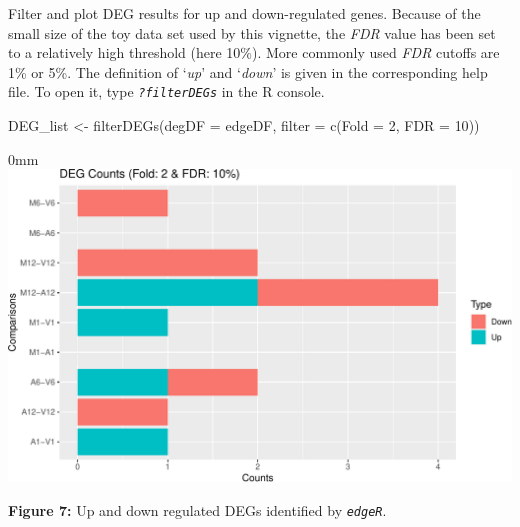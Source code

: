 \documentclass[14pt,]{article}
\newcommand{\hlnum}[1]{\textcolor[rgb]{0.816,0.125,0.439}{#1}}%
\newcommand{\hlstr}[1]{\textcolor[rgb]{0.251,0.627,0.251}{#1}}%
\newcommand{\hlcom}[1]{\textcolor[rgb]{0.502,0.502,0.502}{\textit{#1}}}%
\newcommand{\hlopt}[1]{\textcolor[rgb]{0,0,0}{#1}}%
\newcommand{\hlstd}[1]{\textcolor[rgb]{0.251,0.251,0.251}{#1}}%
\newcommand{\hlkwc}[1]{\textcolor[rgb]{0.251,0.251,0.251}{#1}}%
\newcommand{\hlkwd}[1]{\textcolor[rgb]{0.878,0.439,0.125}{#1}}%
\newenvironment{Shaded}{\begin{myshaded}}{\end{myshaded}}
\newcommand{\KeywordTok}[1]{\hlkwd{#1}}
\newcommand{\DataTypeTok}[1]{\hlkwc{#1}}
\newcommand{\DecValTok}[1]{\hlnum{#1}}
\newcommand{\StringTok}[1]{\hlstr{#1}}
\newcommand{\CommentTok}[1]{\hlcom{#1}}
\newcommand{\OperatorTok}[1]{\hlopt{#1}}
\newcommand{\NormalTok}[1]{\hlstd{#1}}
\begin{document}
Filter and plot DEG results for up and down-regulated genes. Because of the small size of the toy data set used by this vignette, the \emph{FDR} value has been set to a relatively high threshold (here 10\%). More commonly used \emph{FDR} cutoffs are 1\% or 5\%. The definition of `\emph{up}' and `\emph{down}' is given in the corresponding help file. To open it, type \emph{\texttt{?filterDEGs}} in the R console.

\begin{Shaded}
\begin{Highlighting}[]
\NormalTok{DEG_list <-}\StringTok{ }\KeywordTok{filterDEGs}\NormalTok{(}\DataTypeTok{degDF =}\NormalTok{ edgeDF, }\DataTypeTok{filter =} \KeywordTok{c}\NormalTok{(}\DataTypeTok{Fold =} \DecValTok{2}\NormalTok{, }\DataTypeTok{FDR =} \DecValTok{10}\NormalTok{))}
\end{Highlighting}
\end{Shaded}

\begin{adjustwidth}{\fltoffset}{0mm}
\includegraphics{systemPipeR_files/figure-latex/edger_deg_counts-1} \end{adjustwidth}

\textbf{Figure 7:} Up and down regulated DEGs identified by \emph{\texttt{edgeR}}.

\begin{Shaded}
\end{Shaded}
\end{document}
